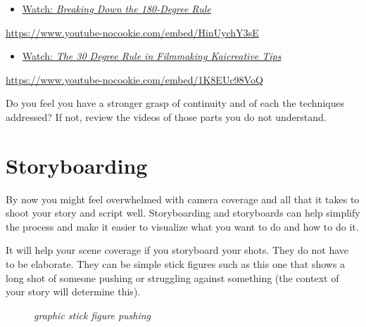 \documentclass[
  letterpaper,
  DIV=11,
  numbers=noendperiod]{scrreprt}
\providecommand{\tightlist}{%
  \setlength{\itemsep}{0pt}\setlength{\parskip}{0pt}}\usepackage{longtable,booktabs,array}
\begin{document}
\begin{tcolorbox}
\begin{itemize}
\tightlist
\item
  \href{https://www.youtube.com/watch?v=HinUychY3sE}{Watch:
  \emph{Breaking Down the 180-Degree Rule}}
\end{itemize}

\url{https://www.youtube-nocookie.com/embed/HinUychY3sE}

\begin{itemize}
\tightlist
\item
  \href{https://www.youtube.com/watch?v=1K8EUc98VoQ}{Watch: \emph{The 30
  Degree Rule in Filmmaking \textbar{} Kaicreative \textbar{} Tips}}
\end{itemize}

\url{https://www.youtube-nocookie.com/embed/1K8EUc98VoQ}

Do you feel you have a stronger grasp of continuity and of each the
techniques addressed? If not, review the videos of those parts you do
not understand.

\end{tcolorbox}

\section{Storyboarding}\label{storyboarding}

By now you might feel overwhelmed with camera coverage and all that it
takes to shoot your story and script well. Storyboarding and storyboards
can help simplify the process and make it easier to visualize what you
want to do and how to do it.

It will help your scene coverage if you storyboard your shots. They do
not have to be elaborate. They can be simple stick figures such as this
one that shows a long shot of someone pushing or struggling against
something (the context of your story will determine this).

\begin{figure}

\caption{\label{fig-Picture1}\emph{graphic stick figure pushing}}


\end{figure}%
\end{document}
